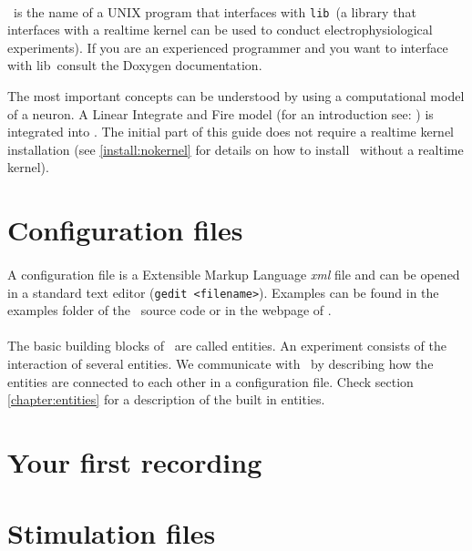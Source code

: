 \paragraph{}
\progname\ is the name of a UNIX program that interfaces with \texttt{lib\progname}\  (a library that interfaces with a realtime kernel can be used to conduct electrophysiological experiments). If you are an experienced programmer and you want to interface with lib\progname\, consult the Doxygen documentation.

The most important concepts can be understood by using a computational model of a neuron. A Linear Integrate and Fire model (for an introduction see: \cite{Koch:1989}) is integrated into \progname. The initial part of this guide does not require a realtime kernel installation (see \ref{install:nokernel} for details on how to install \progname\ without a realtime kernel).

\section{Configuration files}

\paragraph{}
A configuration file is a Extensible Markup Language \emph{xml} file and can be opened in a standard text editor (\texttt{gedit <filename>}). Examples can be found in the examples folder of the \progname\ source code or in the webpage of \href{http://www.tnb.ua.ac.be}{\progname}.

\paragraph{}
The basic building blocks of \progname\ are called entities. An experiment consists of the interaction of several entities. We communicate with \progname\ by describing how the entities are connected to each other in a configuration file. Check section \ref{chapter:entities} for a description of the built in entities.

\section{Your first recording}





\section{Stimulation files}
